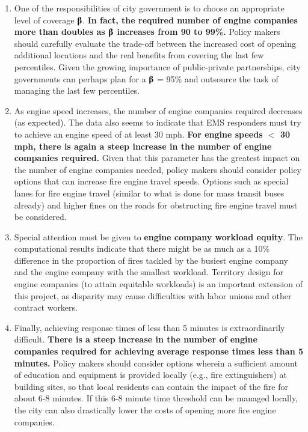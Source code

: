 \documentclass{article} %
\begin{document}
\begin{enumerate}
\item  One of the responsibilities of city government is to choose an appropriate level of coverage \textbf{$\boldsymbol{\betaup}$}.   \textbf{In fact, the required number of engine companies more than doubles as $\boldsymbol{\betaup}$ increases from 90 to 99\%.}  Policy makers should carefully evaluate the trade-off between the increased cost of opening additional locations and the real benefits from covering the last few percentiles.   Given the growing importance of public-private partnerships, city governments can perhaps plan for a \textbf{$\boldsymbol{\betaup}$ }= 95\% and outsource the task of managing the last few percentiles.

\item  As engine speed increases, the number of engine companies required decreases (as expected).  The data also seems to indicate that EMS responders must try to achieve an engine speed of at least 30 mph.  \textbf{For engine speeds $\boldsymbol{<}$ 30 mph, there is again a steep increase in the number of engine companies required.}  Given that this parameter has the greatest impact on the number of engine companies needed, policy makers should consider policy options that can increase fire engine travel speeds.  Options such as special lanes for fire engine travel (similar to what is done for mass transit buses already) and higher fines on the roads for obstructing fire engine travel must be considered.

\item  Special attention must be given to \textbf{engine company workload equity}.  The computational results indicate that there might be as much as a 10\% difference in the proportion of fires tackled by the busiest engine company and the engine company with the smallest workload.  Territory design for engine companies (to attain equitable workloads) is an important extension of this project, as disparity may cause difficulties with labor unions and other contract workers.

\item  Finally, achieving response times of less than 5 minutes is extraordinarily difficult.  \textbf{There is a steep increase in the number of engine companies required for achieving average response times less than 5 minutes.}  Policy makers should consider options wherein a sufficient amount of education and equipment is provided locally (e.g., fire extinguishers) at building sites, so that local residents can contain the impact of the fire for about 6-8 minutes.  If this 6-8 minute time threshold can be managed locally, the city can also drastically lower the costs of opening more fire engine companies.
\end{enumerate}
\end{document}
